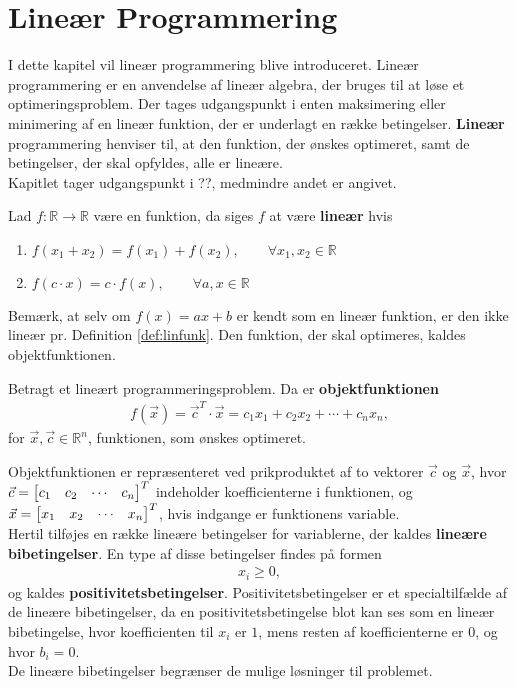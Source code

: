 \chapter{Lineær Programmering}
I dette kapitel vil lineær programmering blive introduceret.
Lineær programmering er en anvendelse af lineær algebra, der bruges til at løse et optimeringsproblem. Der tages udgangspunkt i enten maksimering eller minimering af en lineær funktion, der er underlagt en række betingelser. \textbf{Lineær} programmering henviser til, at den funktion, der ønskes optimeret, samt de betingelser, der skal opfyldes, alle er lineære. \\
Kapitlet tager udgangspunkt i ??, medmindre andet er angivet. 

\begin{defn}
Lad $f:\mathds{R} \to \mathds{R}$ være en funktion, da siges $f$ at være \textbf{lineær} hvis
\begin{enumerate}[label=\alph*]
\item $f(x_1 + x_2) = f(x_1) + f(x_2), \qquad \forall x_1,x_2 \in \mathds{R}$
\item $f(c\cdot x) = c \cdot f(x), \qquad \forall a, x \in \mathds{R}$
\end{enumerate}
\label{def:linfunk}
\end{defn}

Bemærk, at selv om $f(x) = ax + b$ er kendt som en lineær funktion, er den ikke lineær pr. Definition \ref{def:linfunk}.
Den funktion, der skal optimeres, kaldes objektfunktionen.
\begin{defn}
Betragt et lineært programmeringsproblem. Da er \textbf{objektfunktionen}
\begin{align*}
f(\vec{x}) = \vec{c}^T \cdot \vec{x} = c_1x_1 + c_2x_2 + \cdots + c_nx_n, 
\end{align*}
for $\vec{x}, \vec{c} \in \mathds{R}^n$, 
funktionen, som ønskes optimeret. 
\end{defn}

Objektfunktionen er repræsenteret ved prikproduktet af to vektorer $\vec{c}$ og $\vec{x}$, hvor $\vec{c}= \begin{bmatrix} c_1 & c_2 & \cdots & c_n \end{bmatrix}^T$ indeholder koefficienterne i funktionen, og $\vec{x}= \begin{bmatrix} x_1 & x_2 & \cdots & x_n \end{bmatrix}^T$, hvis indgange er funktionens variable. \\
Hertil tilføjes en række lineære betingelser for variablerne, der kaldes \textbf{lineære bibetingelser}. En type af disse betingelser findes på formen
\begin{align*}
	x_i \geq 0,
\end{align*}
og kaldes \textbf{positivitetsbetingelser}. Positivitetsbetingelser er et specialtilfælde af de lineære bibetingelser, da en positivitetsbetingelse blot kan ses som en lineær bibetingelse, hvor koefficienten til $x_i$ er $1$, mens resten af koefficienterne er $0$, og hvor $b_i=0$. \\
De lineære bibetingelser begrænser de mulige løsninger til problemet.

